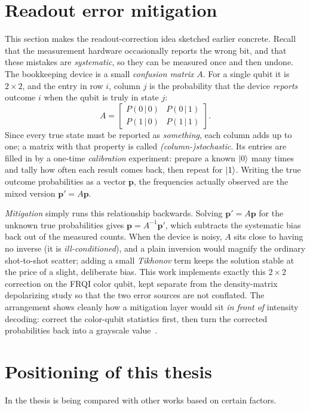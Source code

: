 \section{Readout error mitigation}
This section makes the readout-correction idea sketched earlier concrete. Recall that the measurement hardware occasionally reports the wrong bit, and that these mistakes are \emph{systematic}, so they can be measured once and then undone. The bookkeeping device is a small \emph{confusion matrix} $A$. For a single qubit it is $2\times 2$, and the entry in row $i$, column $j$ is the probability that the device \emph{reports} outcome $i$ when the qubit is truly in state $j$:
\begin{equation}
A = \begin{bmatrix} P(0\,|\,0) & P(0\,|\,1) \\[2pt] P(1\,|\,0) & P(1\,|\,1) \end{bmatrix}.
\end{equation}
Since every true state must be reported as \emph{something}, each column adds up to one; a matrix with that property is called \emph{(column-)stochastic}. Its entries are filled in by a one-time \emph{calibration} experiment: prepare a known $\ket{0}$ many times and tally how often each result comes back, then repeat for $\ket{1}$. Writing the true outcome probabilities as a vector $\mathbf{p}$, the frequencies actually observed are the mixed version $\mathbf{p}' = A\mathbf{p}$.

\emph{Mitigation} simply runs this relationship backwards. Solving $\mathbf{p}' = A\mathbf{p}$ for the unknown true probabilities gives $\mathbf{p} = A^{-1}\mathbf{p}'$, which subtracts the systematic bias back out of the measured counts. When the device is noisy, $A$ sits close to having no inverse (it is \emph{ill-conditioned}), and a plain inversion would magnify the ordinary shot-to-shot scatter; adding a small \emph{Tikhonov} term keeps the solution stable at the price of a slight, deliberate bias. This work implements exactly this $2\times 2$ correction on the FRQI color qubit, kept separate from the density-matrix depolarizing study so that the two error sources are not conflated. The arrangement shows cleanly how a mitigation layer would sit \emph{in front of} intensity decoding: correct the color-qubit statistics first, then turn the corrected probabilities back into a grayscale value~\cite{Mu2025GuidedImageFiltering}.

\section{Positioning of this thesis}
In  the thesis is being compared with other works based on certain factors.

